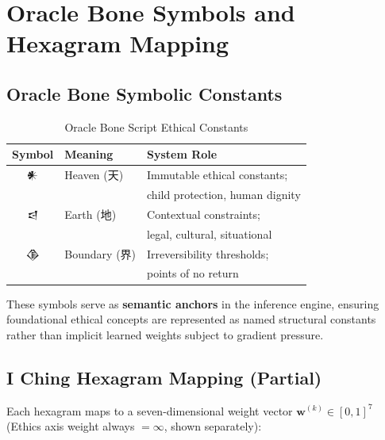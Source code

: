 \documentclass[conference]{IEEEtran}
\begin{document}



\appendix

\section{Oracle Bone Symbols and Hexagram Mapping}
\label{app:symbols}

\subsection{Oracle Bone Symbolic Constants}

\begin{table}[!ht]
\caption{Oracle Bone Script Ethical Constants}
\label{tab:oraclebones}
\centering
\begin{tabular}{cll}
\toprule
\textbf{Symbol} & \textbf{Meaning} & \textbf{System Role} \\
\midrule
𒀭 & Heaven (天) &
  Immutable ethical constants;\\
  & & child protection, human dignity \\
𒁀 & Earth (地) &
  Contextual constraints;\\
  & & legal, cultural, situational \\
𒆠 & Boundary (界) &
  Irreversibility thresholds;\\
  & & points of no return \\
\bottomrule
\end{tabular}
\end{table}

These symbols serve as \textbf{semantic anchors} in the
inference engine, ensuring foundational ethical concepts
are represented as named structural constants rather than
implicit learned weights subject to gradient pressure.

\subsection{I Ching Hexagram Mapping (Partial)}
\label{app:hexagram}

Each hexagram maps to a seven-dimensional weight vector
$\mathbf{w}^{(k)} \in [0,1]^7$ (Ethics axis weight
always $= \infty$, shown separately):
\end{document}
